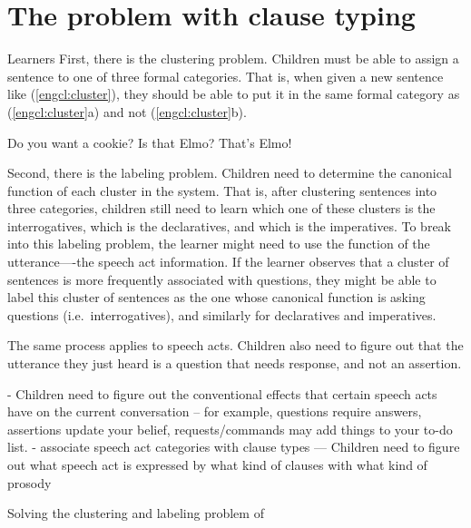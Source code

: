 \section{The problem with clause typing}

Learners 
First, there is the clustering problem. Children must be able to assign a sentence to one of three formal categories. That is, when given a new sentence like (\ref{engcl:cluster}), they should be able to put it in the same formal category as (\ref{engcl:cluster}a) and not (\ref{engcl:cluster}b). 

Do you want a cookie?
\bxl{}
Is that Elmo?
\ex
That’s Elmo!
\exl
\eex

Second, there is the labeling problem. Children need to determine the canonical function of each cluster in the system. That is, after clustering sentences into three categories, children still need to learn which one of these clusters is the interrogatives, which is the declaratives, and which is the imperatives. To break into this labeling problem, the learner might need to use the function of the utterance—-the speech act information. If the learner observes that a cluster of sentences is more frequently associated with questions, they might be able to label this cluster of sentences as the one whose canonical function is asking questions (i.e.\ interrogatives), and similarly for declaratives and imperatives. 

The same process applies to speech acts. Children also need to figure out that the utterance they just heard is a question that needs response, and not an assertion. 


- Children need to figure out the conventional effects that certain speech acts have on the current conversation
-- for example, questions require answers, assertions update your belief, requests/commands may add things to your to-do list.
- associate speech act categories with clause types
--- Children need to figure out what speech act is expressed by what kind of clauses with what kind of prosody

Solving the clustering and labeling problem of   

